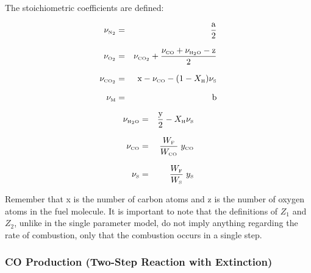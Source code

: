 \documentclass[11pt]{book}
\begin{document}
\noindent
The stoichiometric coefficients are defined:

\parbox{2.5in}{
\begin{eqnarray*}  \nu_{\tiny \hbox{N}_2}  &=& \frac{\hbox{a}}{2}\\*[.1in]
                  \nu_{\tiny \hbox{O}_2}  &=& \nu_{\tiny \hbox{CO}_2} + \frac{\nu_{\tiny \hbox{CO}}+\nu_{\tiny \hbox{H}_2\hbox{O}}-\hbox{z}}{2}\\*[.1in]
                  \nu_{\tiny \hbox{CO}_2} &=& \hbox{x} - \nu_{\tiny \hbox{CO}} - (1-X_{\tiny \hbox{H}}) \nu_{\tiny \hbox{S}}  \\*[.1in]
                  \nu_{\tiny \hbox{M}}     &=& \hbox{b}  \end{eqnarray*} }
\hfill \parbox{3.5in}{\begin{eqnarray}
                  \nu_{\tiny \hbox{H}_2\hbox{O}} &=& \frac{\hbox{y}}{2}- X_{\tiny \hbox{H}} \nu_{\tiny \hbox{S}}\\*[.1in]
                  \nu_{\tiny \hbox{CO}}    &=& \frac{W_{\tiny \hbox{F}}}{W_{\tiny \hbox{CO}}} \; y_{\tiny \hbox{CO}} \\*[.1in]
                  \nu_{\tiny \hbox{S}}    &=& \frac{W_{\tiny \hbox{F}}}{W_{\tiny \hbox{S}}} \; y_{\tiny \hbox{S}}
\end{eqnarray} }
Remember that x is the number of carbon atoms and z is the number of oxygen atoms in the fuel molecule.
It is important to note that the definitions of $Z_1$ and $Z_2$, unlike in the single parameter model,
do not imply anything regarding the rate of combustion, only that the combustion occurs in a single step.


\subsubsection{CO Production (Two-Step Reaction with Extinction)}

\label{co_production}
\end{document}
